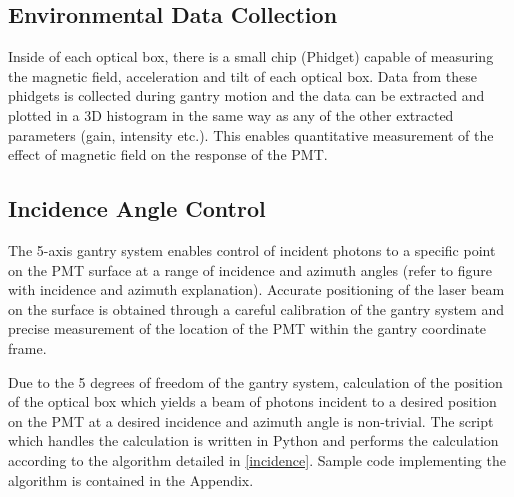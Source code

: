 \documentclass[journal]{IEEEtran}
\begin{document}
\FloatBarrier

\subsection{Environmental Data Collection}

Inside of each optical box, there is a small chip (Phidget) capable of measuring the magnetic field, acceleration and tilt of each optical box.  Data from these phidgets is collected during gantry motion and the data can be extracted and plotted in a 3D histogram in the same way as any of the other extracted parameters (gain, intensity etc.). This enables quantitative measurement of the effect of magnetic field on the response of the PMT. 

\FloatBarrier

\subsection{Incidence Angle Control} \label{sec:incAngle}



The 5-axis gantry system enables control of incident photons to a specific point on the PMT surface at a range of incidence and azimuth angles (refer to figure with incidence and azimuth explanation). Accurate positioning of the laser beam on the surface is obtained through a careful calibration of the gantry system and precise measurement of the location of the PMT within the gantry coordinate frame. 

Due to the 5 degrees of freedom of the gantry system, calculation of the position of the optical box which yields a beam of photons incident to a desired position on the PMT at a desired incidence and azimuth angle is non-trivial. The script which handles the calculation is written in Python and performs the calculation according to the algorithm detailed in \ref{incidence}. Sample code implementing the algorithm is contained in the Appendix.
\end{document}
